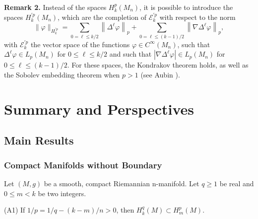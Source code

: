 \documentclass[12pt,hyperref,a4paper,UTF8]{ctexart}
\begin{document}
\vskip 3pt
\textbf{Remark 2.} Instead of the spaces $H_k^p\left(M_n\right)$, it is possible to introduce the spaces $H_k^{\prime p}\left(M_n\right)$, which are the completion of $\mathcal{E}_k^{\prime p}$ with respect to the norm
$$
\|\varphi\|_{H_k^{\prime p} }=\sum_{0=\ell \leq k / 2}\left\|\Delta^{\ell} \varphi\right\|_p+\sum_{0=\ell \leq(k-1) / 2}\left\|\nabla \Delta^{\ell} \varphi\right\|_p,
$$
with $\mathcal{E}_k^{\prime p}$ the vector space of the functions $\varphi \in C^{\infty}\left(M_n\right)$, such that $\Delta^{\ell} \varphi \in L_p\left(M_n\right)$ for $0 \leq \ell \leq k / 2$ and such that $\left|\nabla \Delta^{\ell} \varphi\right| \in L_p\left(M_n\right)$ for $0 \leq \ell \leq(k-1) / 2$. For these spaces, the Kondrakov theorem holds, as well as the Sobolev embedding theorem when $p>1$ (see Aubin \cite{Aubin-}).








































\newpage
\section{Summary and Perspectives}
\label{Sec6}
\subsection{Main Results}

\subsubsection{Compact Manifolds without Boundary}
\vskip -3pt
Let $(M, g)$ be a smooth, compact Riemannian n-manifold.
Let $q\geq 1$ be real and $0 \leq m<k$ be two integers.
    
\vskip 2pt
(A1) If ${1/p=1 / q-(k-m) / n > 0}$, then ${H_k^q(M) \subset H_m^p(M)}$.
    
\end{document}
